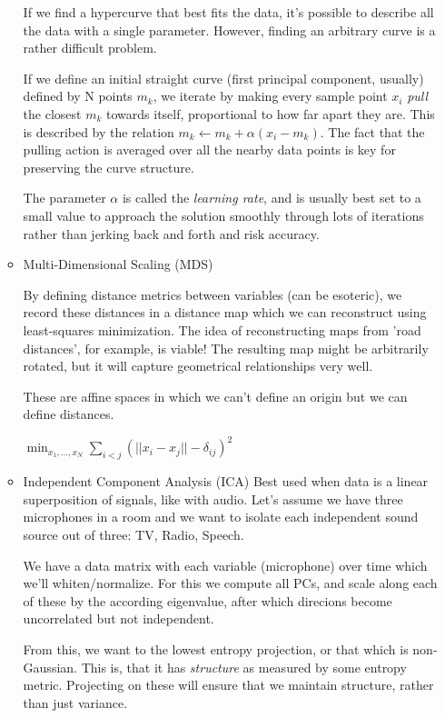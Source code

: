 \documentclass[11pt]{article}
\begin{document}
\begin{itemize}
\begin{itemize}
If we find a hypercurve that best fits the data, it's possible to describe all the data with a single parameter. However, finding an arbitrary curve is a rather difficult problem.

If we define an initial straight curve (first principal component, usually) defined by N points $m_k$, we iterate by making every sample point $x_i$ \emph{pull} the closest $m_k$ towards itself, proportional to how far apart they are. This is described by the relation $m_k \leftarrow m_k + \alpha\left(x_i - m_k\right)$. The fact that the pulling action is averaged over all the nearby data points is key for preserving the curve structure.

The parameter $\alpha$ is called the \emph{learning rate}, and is usually best set to a small value to approach the solution smoothly through lots of iterations rather than jerking back and forth and risk accuracy.


\item Multi-Dimensional Scaling (MDS)
\label{sec-2-2-2-3}

By defining distance metrics between variables (can be esoteric), we record these distances in a distance map which we can reconstruct using least-squares minimization. The idea of reconstructing maps from 'road distances', for example, is viable! The resulting map might be arbitrarily rotated, but it will capture geometrical relationships very well.


These are affine spaces in which we can't define an origin but we can define distances.


$\min_{x_1,...,x_N} \sum_{i<j} \left(||x_i-x_j||-\delta_{ij}\right)^2$


\item Independent Component Analysis (ICA)
\label{sec-2-2-2-4}
Best used when data is a linear superposition of signals, like with audio. Let's assume we have three microphones in a room and we want to isolate each independent sound source out of three: TV, Radio, Speech.

We have a data matrix with each variable (microphone) over time which we'll whiten/normalize. For this we compute all PCs, and scale along each of these by the according eigenvalue, after which direcions become uncorrelated but not independent.

From this, we want to the lowest entropy projection, or that which is non-Gaussian. This is, that it has \emph{structure} as measured by some entropy metric. Projecting on these will ensure that we maintain structure, rather than just variance.


\end{itemize}
\end{itemize}
\end{document}

